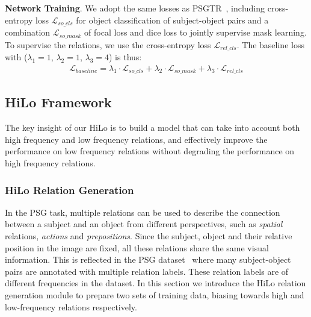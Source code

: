 \noindent \textbf{Network Training}.
We adopt the same losses as PSGTR~\citep{yang2022panoptic}, including cross-entropy loss $\mathcal{L}_{so\_cls}$ for object classification of subject-object pairs and a combination $\mathcal{L}_{so\_mask}$ of focal loss and dice loss to jointly supervise mask learning.
To supervise the relations, we use the cross-entropy loss $\mathcal{L}_{rel\_cls}$.
The baseline loss with (${\lambda}_{1} = 1$, ${\lambda}_{2} = 1$, ${\lambda}_{3} = 4$) is thus:
\begin{align}
\mathcal{L}_{baseline} = {\lambda}_{1} \cdot \mathcal{L}_{so\_cls} + {\lambda}_{2} \cdot \mathcal{L}_{so\_mask} + {\lambda}_{3} \cdot \mathcal{L}_{rel\_cls}
\end{align}

\subsection{HiLo Framework}
\label{hilo:sec:framework}

The key insight of our HiLo is to build a model that can take into account both high frequency and low frequency relations, and effectively improve the performance on low frequency relations without degrading the performance on high frequency relations.

\subsubsection{HiLo Relation Generation}
\label{hilo:sec:framework:relation_generation}
In the PSG task, multiple relations can be used to describe the connection between a subject and an object from different perspectives, such as \emph{spatial} relations, \emph{actions} and \emph{prepositions}. Since the subject, object and their relative position in the image are fixed, all these relations share the same visual information.
%
This is reflected in the PSG dataset~\citep{yang2022panoptic} where many subject-object pairs are annotated with multiple relation labels. These relation labels are of different frequencies in the dataset. In this section we introduce the HiLo relation generation module to prepare two sets of training data, biasing towards high and low-frequency relations respectively.

